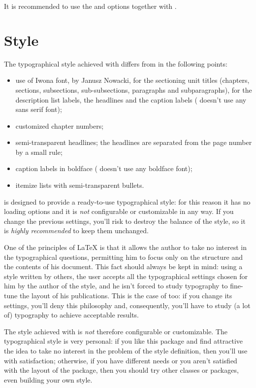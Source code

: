 It is recommended to use the  and  options together with \arsclassica.



\section{Style}

The typographical style achieved with \arsclassica{} differs from \classicthesis{} in the following points:
\begin{itemize}
\item use of Iwona font, by Janusz Nowacki, for the sectioning unit titles (chapters, sections, subsections, sub-subsections, paragraphs and subparagraphs), for the description list labels, the headlines and the caption labels (\classicthesis{} doesn't use any sans serif font);
\item customized chapter numbers;
\item semi-transparent headlines; the headlines are separated from the page number by a small rule;
\item caption labels in boldface (\classicthesis{} doesn't use any boldface font);
\item itemize lists with semi-transparent bullets.
\end{itemize}

\arsclassica{} is designed  to provide a ready-to-use typographical style: for this reason it has no loading options and it is \emph{not} configurable or customizable in any way. If you change the previous settings, you'll risk to destroy the balance of the style, so it is \emph{highly recommended} to keep them unchanged.

One of the principles of \LaTeX{} is that it allows the author to take no interest in the typographical questions, permitting him to focus only on the structure and the contents of his document. This fact should always be kept in mind: using a style written by others, the user accepts all the typographical settings chosen for him by the author of the style, and he isn't forced to study typography to fine-tune the layout of his publications. This is the case of \arsclassica{} too: if you change its settings, you'll deny this philosophy and, consequently, you'll have to study (a lot of) typography to achieve acceptable results.

The style achieved with \arsclassica{} is \emph{not} therefore configurable or customizable. The typographical style is very personal: if you like this package and find attractive the idea to take no interest in the problem of the style definition, then you'll use \arsclassica{} with satisfaction; otherwise, if you have different needs or you aren't satisfied with the layout of the package, then you should try other classes or packages, even building your own style.



